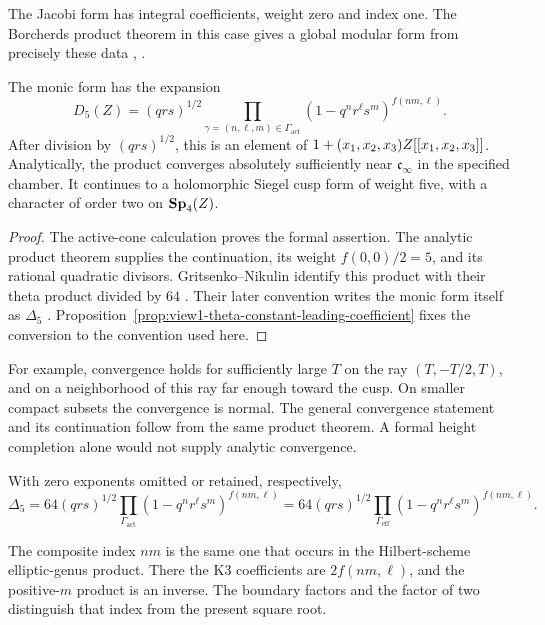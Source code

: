 The Jacobi form has integral coefficients, weight zero and index one.
The Borcherds product theorem in this case gives a global modular form
from precisely these data \cite[Theorem 4.1]{GN},
\cite[Theorem 2.1 and Example 2.4]{GNII}.

\begin{theorem}
\label{thm:view1-borcherds-gritsenko-nikulin-lift}
The monic form has the expansion
\[
 D_5(Z)=(qrs)^{1/2}
 \prod_{\gamma=(n,\ell,m)\in\Gamma_{\mathrm{act}}}
             (1-q^nr^\ell s^m)^{f(nm,\ell)}.
\]
After division by \((qrs)^{1/2}\), this is an element of
\(1+(x_1,x_2,x_3)Z[[x_1,x_2,x_3]]\).
Analytically, the product converges absolutely sufficiently near
\(\mathfrak c_\infty\) in the specified chamber.
It continues to a holomorphic Siegel cusp form of weight five,
with a character of order two on \(\mathbf{Sp}_4(Z)\).
\end{theorem}

\begin{proof}
The active-cone calculation proves the formal assertion.
The analytic product theorem supplies the continuation, its weight
\(f(0,0)/2=5\), and its rational quadratic divisors.
Gritsenko--Nikulin identify this product with their theta product
divided by \(64\) \cite[Theorem 4.1]{GN}.
Their later convention writes the monic form itself as
\(\Delta_5\) \cite[(2.16)]{GNII}.
Proposition~\ref{prop:view1-theta-constant-leading-coefficient}
fixes the conversion to the convention used here.
\end{proof}

For example, convergence holds for sufficiently large \(T\) on the
ray \((T,-T/2,T)\), and on a neighborhood of this ray far enough
toward the cusp.  On smaller compact subsets the convergence is
normal.  The general convergence statement and its continuation
follow from the same product theorem.  A formal height completion
alone would not supply analytic convergence.

\begin{corollary}
\label{cor:view1-theta-normalized-section}
With zero exponents omitted or retained, respectively,
\[
 \Delta_5
 =64(qrs)^{1/2}
       \prod_{\Gamma_{\mathrm{act}}}(1-q^nr^\ell s^m)^{f(nm,\ell)}
 =64(qrs)^{1/2}
       \prod_{\Gamma_{\mathrm{eff}}}(1-q^nr^\ell s^m)^{f(nm,\ell)}.
\]
\end{corollary}

The composite index \(nm\) is the same one that occurs in the
Hilbert-scheme elliptic-genus product.  There the K3 coefficients
are \(2f(nm,\ell)\), and the positive-\(m\) product is an inverse.
The boundary factors and the factor of two distinguish that index
from the present square root.

